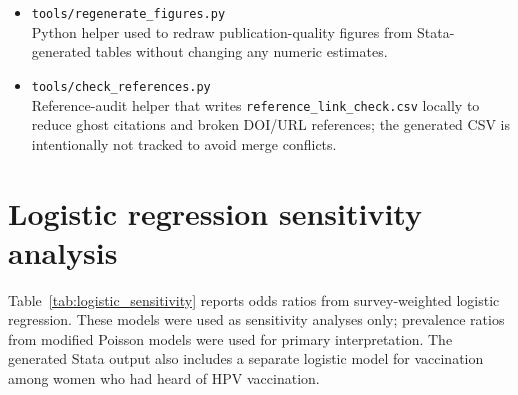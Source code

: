 \begin{itemize}
    Figures copied into the LaTeX figure directory.
    \item \texttt{tools/regenerate\_figures.py}\\
    Python helper used to redraw publication-quality figures from Stata-generated tables without changing any numeric estimates.
    \item \texttt{tools/check\_references.py}\\
    Reference-audit helper that writes \texttt{reference\_link\_check.csv} locally to reduce ghost citations and broken DOI/URL references; the generated CSV is intentionally not tracked to avoid merge conflicts.
\end{itemize}

\section{Logistic regression sensitivity analysis}

Table~\ref{tab:logistic_sensitivity} reports odds ratios from survey-weighted logistic regression. These models were used as sensitivity analyses only; prevalence ratios from modified Poisson models were used for primary interpretation. The generated Stata output also includes a separate logistic model for vaccination among women who had heard of HPV vaccination.

